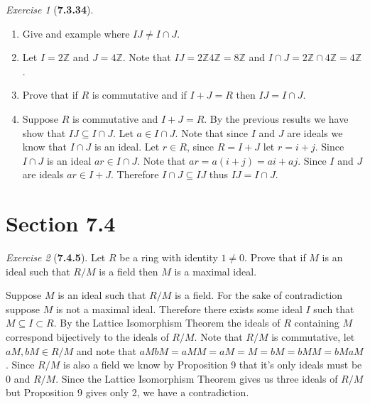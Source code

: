 \documentclass[12pt]{amsart}
\makeatletter
\theoremstyle{remark}
\newtheorem*{exercise}{Exercise}%
\def\ZZ{\ensuremath{\mathbb Z}}
\renewenvironment{proof}[1][\proofname]{\par\doublespacing
  \pushQED{\qed}%
  \normalfont \topsep6\p@\@plus6\p@\relax
  \list{}{%
    \settowidth{\leftmargin}{\itshape\proofname:\hskip\labelsep}%
    \setlength{\labelwidth}{0pt}%
    \setlength{\itemindent}{-\leftmargin}%
  }%
  \item[\hskip\labelsep\itshape#1\@addpunct{:}]\ignorespaces
}{%
  \popQED\endlist\@endpefalse
  \singlespacing
}
\theoremstyle{mycomment}
\makeatother
\begin{document}
\begin{exercise}[\textbf{7.3.34}]
\begin{enumerate}
    \item[c.] Give and example where $IJ \neq I \cap J$.
    \begin{proof} Let $I = 2\ZZ$ and $J = 4\ZZ$. Note that $IJ = 2\ZZ 4\ZZ = 8\ZZ$ and $I \cap J = 2\ZZ \cap 4\ZZ = 4\ZZ$. 
    \end{proof}
    \vspace{.15in}

    \item[d.] Prove that if $R$ is commutative and if $I + J = R$ then $IJ = I\cap J$. 
    \begin{proof} Suppose $R$ is commutative and $I + J = R$. By the previous results we have show that $IJ \subseteq I\cap J$. 
      Let $a \in I \cap J$. Note that since $I$ and $J$ are ideals we know that $I \cap J$ is an ideal. Let $r \in R$, since $R = I +J$
      let $r = i + j$. Since $I \cap J$ is an ideal $ar \in I \cap J$. Note that $ar = a(i + j) = ai + aj$. Since $I$ and $J$ are ideals 
      $ar \in I + J$. Therefore $I \cap J \subseteq IJ$ thus $IJ = I\cap J$.
    \end{proof}
    \vspace{.15in}



  \end{enumerate}
\end{exercise}
\vspace{.5in}

\section*{\textbf{Section 7.4}}



\begin{exercise}[\textbf{7.4.5}]Let $R$ be a ring with identity $1 \neq 0$. Prove that if $M$ is an ideal such that $R/M$ is a field then $M$
  is a maximal ideal. 
    \begin{proof} Suppose $M$ is an ideal such that $R/M$ is a field. For the sake of contradiction suppose $M$ is not a maximal ideal. Therefore there exists some ideal $I$
      such that $M \subseteq I \subset R$. By the Lattice Isomorphism Theorem the ideals of $R$ containing $M$ correspond bijectively to 
      the ideals of $R/M$. Note that $R/M$ is commutative, let $aM, bM \in R/M$ and note that $aMbM = aMM = aM = M = bM = bMM = bMaM$. Since $R/M$ is also a field we know by Proposition 9 that it's only ideals must be
      $0$ and $R/M$. Since the Lattice Isomorphism Theorem gives us three ideals of $R/M$ but Proposition 9 gives only 2, we have a contradiction.

  \end{proof}
\end{exercise}
\vspace{.5in}
\end{document}
